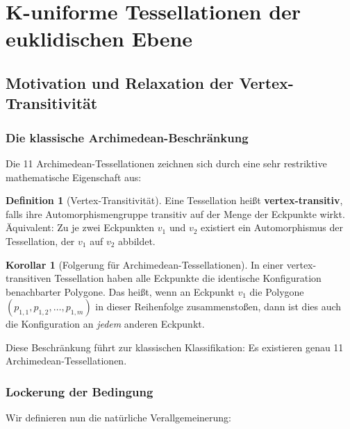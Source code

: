 \documentclass[a4paper,12pt]{article}
\theoremstyle{definition}
\newtheorem{definition}{Definition}[section]
\newtheorem{korollar}{Korollar}[section]
\begin{document}

\section{K-uniforme Tessellationen der euklidischen Ebene}

\subsection{Motivation und Relaxation der Vertex-Transitivität}

\subsubsection{Die klassische Archimedean-Beschränkung}

Die 11 Archimedean-Tessellationen zeichnen sich durch eine sehr restriktive mathematische Eigenschaft aus:

\begin{definition}[Vertex-Transitivität]
	Eine Tessellation heißt \textbf{vertex-transitiv}, falls ihre Automorphismengruppe transitiv auf der Menge der Eckpunkte wirkt. Äquivalent: Zu je zwei Eckpunkten $v_1$ und $v_2$ existiert ein Automorphismus der Tessellation, der $v_1$ auf $v_2$ abbildet.
\end{definition}

\begin{korollar}[Folgerung für Archimedean-Tessellationen]
	In einer vertex-transitiven Tessellation haben alle Eckpunkte die identische Konfiguration benachbarter Polygone. Das heißt, wenn an Eckpunkt $v_1$ die Polygone $(p_{1,1}, p_{1,2}, \ldots, p_{1,m})$ in dieser Reihenfolge zusammenstoßen, dann ist dies auch die Konfiguration an \textit{jedem} anderen Eckpunkt.
\end{korollar}

Diese Beschränkung führt zur klassischen Klassifikation: Es existieren genau 11 Archimedean-Tessellationen.

\subsubsection{Lockerung der Bedingung}

Wir definieren nun die natürliche Verallgemeinerung:
\end{document}

